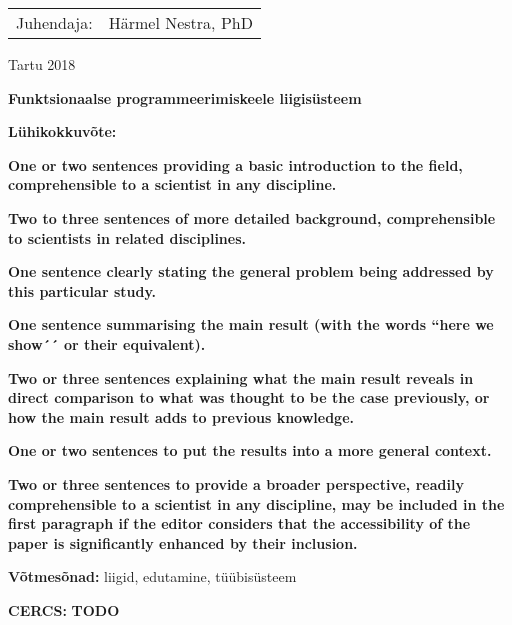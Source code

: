 \documentclass[12pt]{article}
\newcommand\markus[1]{\textcolor{roheline}{\textbf{#1}}}
\begin{document}
  \begin{flushright}
    {
      \setlength{\extrarowheight}{5pt}
      \begin{tabular}{rl} 
        Juhendaja: & Härmel Nestra, PhD
      \end{tabular}}
  \end{flushright}
  \vfill
  \centerline{Tartu 2018}
  \newpage
{
\noindent\textbf{\large Funktsionaalse programmeerimiskeele liigisüsteem}

\vspace*{1ex}

\noindent\textbf{Lühikokkuvõte:} 

\markus{One or two sentences providing a basic introduction to the field, comprehensible to a scientist in
any discipline.}

\markus{Two to three sentences of
more detailed background, comprehensible to scientists in related disciplines.}

\markus{One sentence clearly stating the general problem being addressed by this particular
study.}

\markus{One sentence summarising the main result (with the words ``here we show´´ or their equivalent).}

\markus{Two or three sentences explaining what
the main result reveals in direct
comparison to what was thought to be the case previously, or how the main result adds to previous knowledge.}

\markus{One or two sentences to put the results into a more general context.}

\markus{Two or three sentences to provide a
broader perspective, readily
comprehensible to a scientist in any
discipline, may be included in the first paragraph
if the editor considers that the accessibility of
the paper is significantly enhanced by their inclusion.}

\vspace*{1ex}

\noindent
\textbf{Võtmesõnad:} liigid, edutamine, tüübisüsteem

\vspace*{1ex}

\noindent\textbf{CERCS:} \markus{TODO}

\vspace*{1ex}}
\end{document}
